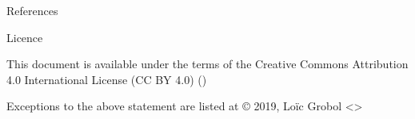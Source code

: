 \documentclass[xcolor={svgnames}, french]{beamer}
\begin{document}
\begin{frame}[allowframebreaks]{References}
	\printbibliography[heading=none]
\end{frame}

\begin{frame}{Licence}
	\begin{center}
		{\huge \ccby}
		\vfill
		This document is available under the terms of the Creative Commons Attribution 4.0 International License (CC BY 4.0) ()

		Exceptions to the above statement are listed at {\small{}}
		\vfill
		© 2019, Loïc Grobol <>

	\end{center}
\end{frame}
\end{document}

